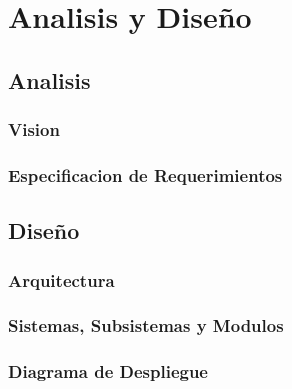
\chapter{Analisis y Diseño}
\label{capitulo3}

\section{Analisis}

\subsection{Vision}

\subsection{Especificacion de Requerimientos}

\section{Diseño}

\subsection{Arquitectura}

\subsection{Sistemas, Subsistemas y Modulos}

\subsection{Diagrama de Despliegue}
